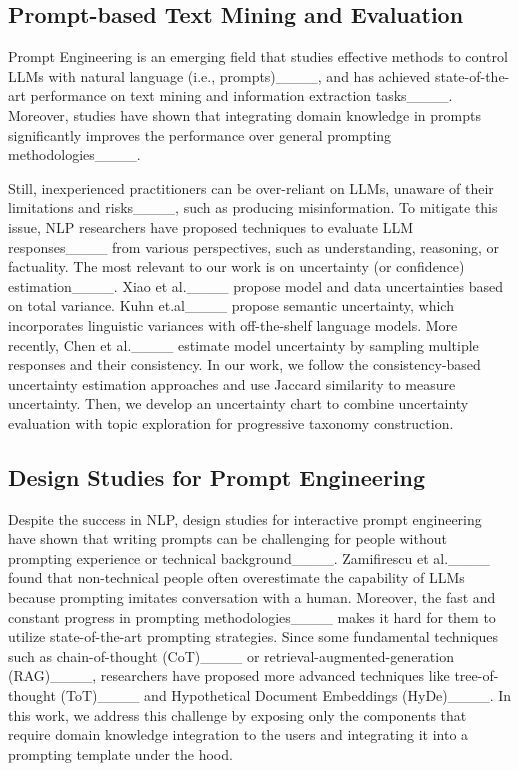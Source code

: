 \vspace*{-0.15cm}
\subsection{Prompt-based Text Mining and Evaluation}
Prompt Engineering is an emerging field that studies effective methods to control LLMs with natural language (i.e., prompts)____, and has achieved state-of-the-art performance on text mining and information extraction tasks____.
Moreover, studies have shown that integrating domain knowledge in prompts significantly improves the performance over general prompting methodologies____. 

Still, inexperienced practitioners can be over-reliant on LLMs, unaware of their limitations and risks____, such as producing misinformation. To mitigate this issue, NLP researchers have proposed techniques to evaluate LLM responses____ from various perspectives, such as understanding, reasoning, or factuality. The most relevant to our work is on uncertainty (or confidence) estimation____.
Xiao et al.____ propose model and data uncertainties based on total variance. Kuhn et.al____ propose semantic uncertainty, which incorporates linguistic variances with off-the-shelf language models. More recently, Chen et al.____ estimate model uncertainty by sampling multiple responses and their consistency.
In our work, we follow the consistency-based uncertainty estimation approaches and use Jaccard similarity to measure uncertainty. 
Then, we develop an uncertainty chart to combine uncertainty evaluation with topic exploration for progressive taxonomy construction.

\subsection{Design Studies for Prompt Engineering}
Despite the success in NLP, design studies for interactive prompt engineering have shown that writing prompts can be challenging for people without prompting experience or technical background____.
Zamifirescu et al.____ found that non-technical people often overestimate the capability of LLMs because prompting imitates conversation with a human.
Moreover, the fast and constant progress in prompting methodologies____ makes it hard for them to utilize state-of-the-art prompting strategies.
Since some fundamental techniques such as chain-of-thought (CoT)____ or retrieval-augmented-generation (RAG)____, researchers have proposed more advanced techniques like tree-of-thought (ToT)____ and Hypothetical Document Embeddings (HyDe)____. 
In this work,  we address this challenge by exposing only the components that require domain knowledge integration to the users and integrating it into a prompting template under the hood.


